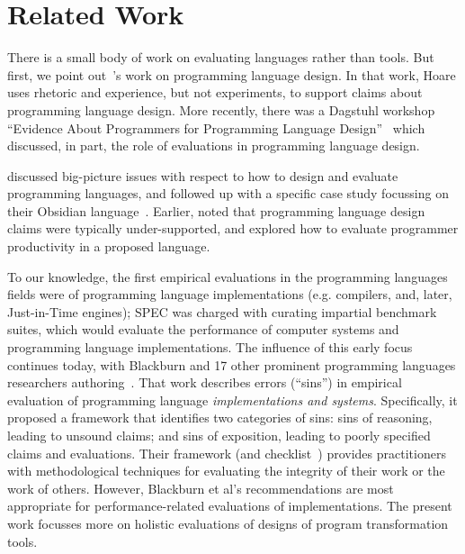 \section{Related Work}
\label{sec:related}
There is a small body of work on evaluating languages rather than tools.
But first, we point out~'s work on programming language
design. In that work, Hoare uses rhetoric and experience, but not experiments,
to support claims about programming language design. More recently,
there was a Dagstuhl workshop ``Evidence About Programmers for Programming
Language Design''~\cite{stefik18:_eviden_about_progr_progr_languag_desig} which discussed, in part, the role of evaluations in programming language design.


discussed big-picture issues with respect to how to design and evaluate programming languages, and followed up with a specific case study focussing on their Obsidian
language~\cite{coblenz20:_can_advan_type_system_be_usabl}.
Earlier,  noted that programming 
language design claims were typically under-supported, and  explored how to evaluate programmer productivity in a
proposed language. 

To our knowledge, the first empirical evaluations in the programming
languages fields were of programming language implementations
(e.g. compilers, and, later, Just-in-Time engines); 
SPEC was charged with curating impartial benchmark suites,
which would evaluate the performance of
computer systems and programming language implementations. 
The influence of this early focus continues
today, with Blackburn and 17 other prominent programming languages
researchers
authoring~\cite{blackburn16:_truth_whole_truth_nothin_but_truth}. That
work describes errors (``sins'') in empirical evaluation of programming
language \emph{implementations and systems}.  Specifically, it proposed a
framework that identifies two categories of sins: sins of reasoning,
leading to unsound claims; and sins of exposition, leading to poorly
specified claims and evaluations. Their framework (and 
checklist~\cite{berger19:_check_manif_empir_evaluat}) provides
practitioners with methodological techniques for evaluating the
integrity of their work or the work of others.  However, Blackburn et al's
recommendations are most appropriate for
performance-related evaluations of implementations. 
The present work focusses more on holistic
evaluations of designs of program transformation tools.

